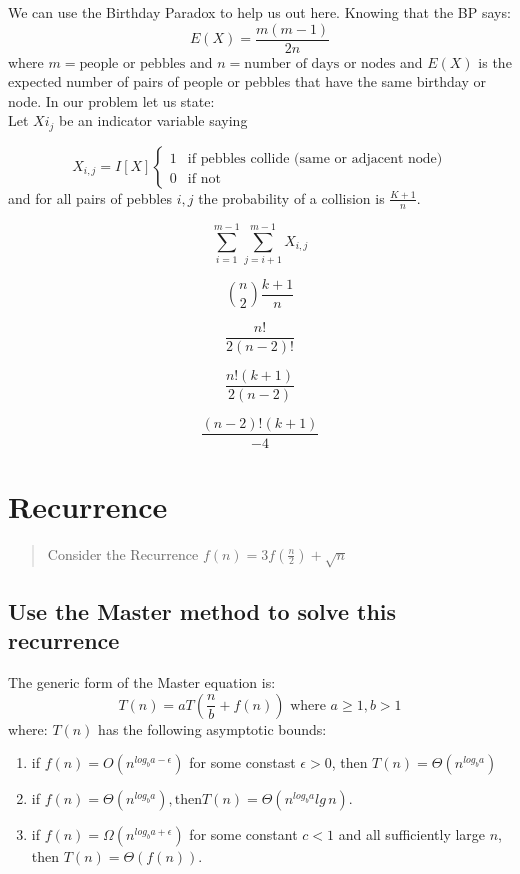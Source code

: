 \documentclass[titlepage]{article}\usepackage[]{graphicx}\usepackage[]{color}
\begin{document}
We can use the Birthday Paradox to help us out here. Knowing that the BP says:
\[ E(X) = \frac{m(m-1)}{2n} \]
where $m = \text{people or pebbles}$ and $n = \text{number of days or nodes}$
and $E(X)$ is the expected number of pairs of people or pebbles that have the
same birthday or node. In our problem let us state:\\

Let $X{i_j}$ be an indicator variable saying 

\[
	X_{i,j} = I[X]
	\begin{cases}
		1 & \text{if pebbles collide (same or adjacent node)} \\
		0 & \text{if not } 
	\end{cases}
\]
and for all pairs of pebbles $i,j$ the probability of a collision is
$\frac{K+1}{n}$.


\[ \sum_{i=1}^{m-1} \sum_{j=i+1}^{m-1} X_{i,j} \] 

\[ {n \choose 2} \frac{k+1}{n} \]

\[ \frac{n!}{2(n-2)!} \]

\[ \frac{n!(k+1)}{2(n-2)} \]

\[ \frac{(n-2)!(k+1)}{-4} \]


\section{Recurrence}

\begin{quote}
	Consider the Recurrence $f(n) = 3f(\frac{n}{2}) + \sqrt{n}$
\end{quote}

\subsection{Use the Master method to solve this recurrence}
The generic form of the Master equation is:
\[ T(n) = aT\left(\frac{n}{b} + f(n)\right) \text{ where } a\geq 1, b> 1 \]
where:
$T(n)$ has the following asymptotic bounds:
\begin{enumerate}
	\item if $f(n) = O\left(n^{log_b a-\epsilon}\right)$ for some constast
		$\epsilon > 0$, then $T(n) = \Theta(n^{log_b a})$
	\item if $f(n) = \Theta(n^{log_b a}), \text{then} T(n) =
		\Theta\left(n^{log_b a} lg\,n\right)$. 
	\item if $f(n) = \Omega\left(n^{log_b a + \epsilon}\right)$ for some
		constant $c < 1$ and all sufficiently large $n$, then $T(n) =
		\Theta(f(n))$. 
\end{enumerate}
\end{document}
